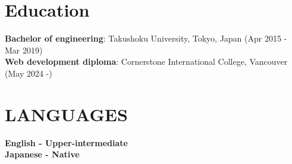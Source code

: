 \documentclass[letterpaper,11pt]{article}
\begin{document}
\section{Education}
 \begin{itemize}[leftmargin=0.15in, label={}]
    \small{\item{
     \textbf{Bachelor of engineering}{: Takushoku University, Tokyo, Japan (Apr 2015 - Mar 2019)} \\
     \textbf{Web development diploma}{: Cornerstone International College, Vancouver (May 2024 -)} \\
    }}
 \end{itemize}

\section{LANGUAGES}
 \begin{itemize}[leftmargin=0.15in, label={}]
    \small{\item{
     \textbf{English - Upper-intermediate} \\
     \textbf{Japanese - Native} \\
    }}
 \end{itemize}


\end{document}
